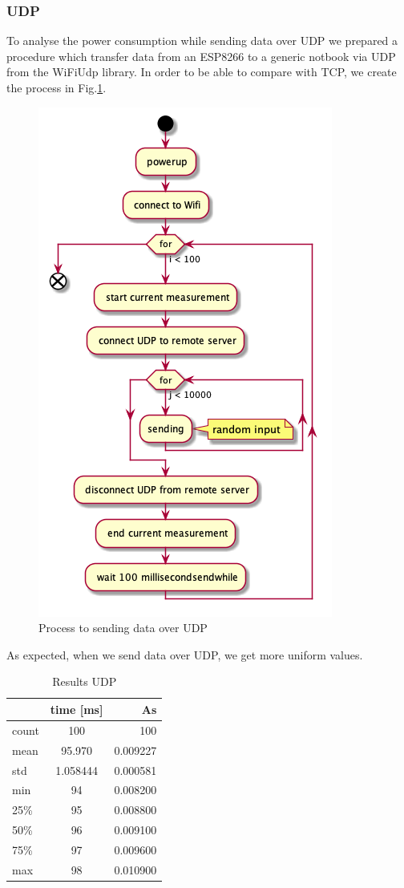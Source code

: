 \subsubsection{UDP}
To analyse the power consumption while sending data over UDP we prepared a procedure which
transfer data from an ESP8266 to a generic notbook  via UDP from the WiFiUdp library.
In order to be able to compare with TCP, we create the process in Fig.\ref{fig:udp_uml}.
\linebreak\
\begin{figure}[H]
\centering
\includegraphics[width = 0.7 \linewidth]{fig/udp_tcp/udp_uml.png}
\caption{Process to sending data over UDP}
\label{fig:udp_uml}
\end{figure}
As expected, when we send data over UDP, we get more uniform values.
\linebreak\linebreak
\begin{table}[H]
\begin{center}
\caption{Results UDP}
\label{tab:table2}
\renewcommand{\arraystretch}{1.8}
\begin{tabular}{l|c|r}
& \textbf{time [ms]} & \textbf{As}\\
\hline
count & 100 & 100\\
mean & 95.970 & 0.009227\\
std & 1.058444 & 0.000581\\
min & 94 & 0.008200\\
25\% & 95 & 0.008800\\
50\% & 96 & 0.009100\\
75\% & 97 & 0.009600\\
max & 98 & 0.010900\\
\end{tabular}
\end{center}
\end{table}
